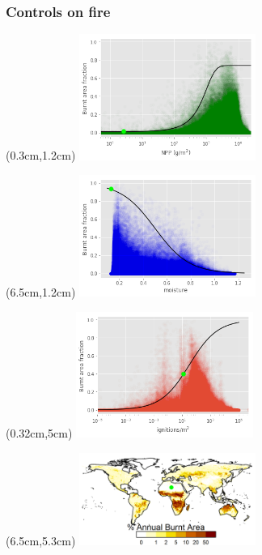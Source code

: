 \addtocounter{framenumber}{-1}

\begin{frame}
	\frametitle{Controls on fire}
	\begin{textblock*}{14cm}(0.3cm,1.2cm)
		\includegraphics[width=5.78cm]{images/limitCurves/Desert/NPPVsFire}	
	\end{textblock*}
	\begin{textblock*}{14cm}(6.5cm,1.2cm)
		\includegraphics[width=5.78cm]{images/limitCurves/Desert/alphaVsFire}	
	\end{textblock*}
	\begin{textblock*}{14cm}(0.32cm,5cm)
		\includegraphics[width=5.78cm]{images/limitCurves/Desert/ignitionsVsFire.png}		
	\end{textblock*}
	\begin{textblock*}{14cm}(6.5cm,5.3cm)
		\includegraphics[width=5.78cm]{images/limitCurves/Desert/fireMap.png}		
	\end{textblock*}
\end{frame}


